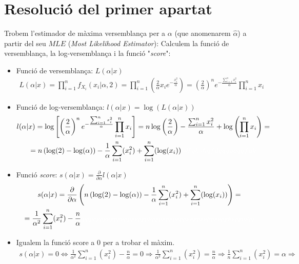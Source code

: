 \documentclass[12pt]{article}
\begin{document}
\section{Resolució del primer apartat}
Trobem l'estimador de màxima versemblança per a $\alpha$ (que anomenarem $\hat{\alpha}$) a partir del seu $MLE$ (\textit{Most Likelihood Estimator}): Calculem la funció de versemblança, la log-versemblança i la funció "\textit{score}":
\begin{itemize}
    \item Funció de versemblança: $L(\alpha|x)$
    \begin{multline*}
        L(\alpha|x)=\prod_{i=1}^{n}f_{X_i}(x_i|\alpha,2)=\prod_{i=1}^{n}\left( \frac{2}{\alpha}x_i e^{-\frac{x_i^2}{\alpha}} \right) = \left( \frac{2}{\alpha} \right)^n e^{-\frac{\sum_{i=1}^{n}x_i^2}{\alpha}}\prod_{i=1}^{n}x_i
    \end{multline*}
    \item Funció de log-versemblança: $l(\alpha|x)=\log(L(\alpha|x))$
    \begin{multline*}
        l(\alpha|x)=\log \left[\left( \frac{2}{\alpha} \right)^n e^{-\frac{\sum_{i=1}^{n}x_i^2}{\alpha}}\prod_{i=1}^{n}x_i\right]=n\log\left(\frac{2}{\alpha}\right) -\frac{\sum_{i=1}^{n}x_i^2}{\alpha}+\log\left(\prod_{i=1}^{n}x_i\right)=\\=n\left(\log(2)-\log(\alpha)\right)-\frac{1}{\alpha}\sum_{i=1}^{n}(x_i^2)+\sum_{i=1}^{n}(\log(x_i))\textcolor{white}{sdfghjhgfdgggggggfgh}
    \end{multline*}
    \item Funció \textit{score}: $s(\alpha|x)=\frac{\partial}{\partial\alpha}l(\alpha|x)$
    \begin{multline*}
        s(\alpha|x)=\frac{\partial}{\partial\alpha}\left( n\left(\log(2)-\log(\alpha)\right)-\frac{1}{\alpha}\sum_{i=1}^{n}(x_i^2)+\sum_{i=1}^{n}(\log(x_i)) \right)=\\=\frac{1}{\alpha^2}\sum_{i=1}^{n}(x_i^2)-\frac{n}{\alpha}\textcolor{white}{qqqqqqqqqqqqqqqqqqqqqqqqqqqqqqqqqqqqqqqqqqqqqqqqqq}
    \end{multline*}
    \item Igualem la funció score a $0$ per a trobar el màxim.
    \begin{multline*}
        s(\alpha|x)=0 \Longleftrightarrow \frac{1}{\alpha^2}\sum_{i=1}^{n}(x_i^2)-\frac{n}{\alpha}=0 \Longrightarrow \frac{1}{\alpha^2}\sum_{i=1}^{n}(x_i^2) = \frac{n}{\alpha} \Longrightarrow \frac{1}{n}\sum_{i=1}^{n}(x_i^2) = \alpha  \Rightarrow\\

\end{multline*}
\end{itemize}
\end{document}
